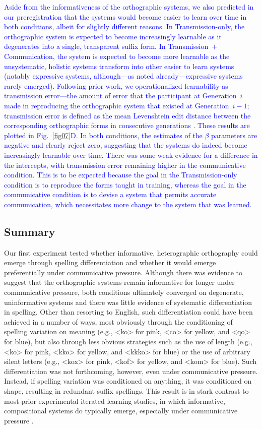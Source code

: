 \documentclass[doc,biblatex]{apa7}
\newcommand\newmaterial[1]{\textcolor{blue}{#1}}
\begin{document}
\newmaterial{Aside from the informativeness of the orthographic systems, we also predicted in our preregistration that the systems would become easier to learn over time in both conditions, albeit for slightly different reasons. In Transmission-only, the orthographic system is expected to become increasingly learnable as it degenerates into a single, transparent suffix form. In Transmission~+ Communication, the system is expected to become more learnable as the unsystematic, holistic systems transform into other easier to learn systems (notably expressive systems, although---as noted already---expressive systems rarely emerged). Following prior work, we operationalized learnability as transmission error---the amount of error that the participant at Generation~$i$ made in reproducing the orthographic system that existed at Generation~$i-1$; transmission error is defined as the mean Levenshtein edit distance between the corresponding orthographic forms in consecutive generations \parencite[see e.g.,][]{Kirby:2008}. These results are plotted in Fig.~\ref{fig07}D. In both conditions, the estimates of the $\beta$ parameters are negative and clearly reject zero, suggesting that the systems do indeed become increasingly learnable over time. There was some weak evidence for a difference in the intercepts, with transmission error remaining higher in the communicative condition. This is to be expected because the goal in the Transmission-only condition is to reproduce the forms taught in training, whereas the goal in the communicative condition is to devise a system that permits accurate communication, which necessitates more change to the system that was learned.}

\subsection{Summary}

Our first experiment tested whether informative, heterographic orthography could emerge through spelling differentiation and whether it would emerge preferentially under communicative pressure. Although there was evidence to suggest that the orthographic systems remain informative for longer under communicative pressure, both conditions ultimately converged on degenerate, uninformative systems and there was little evidence of systematic differentiation in spelling. Other than resorting to English, such differentiation could have been achieved in a number of ways, most obviously through the conditioning of spelling variation on meaning (e.g., <ko> for pink, <co> for yellow, and <qo> for blue), but also through less obvious strategies such as the use of length (e.g., <ko> for pink, <kko> for yellow, and <kkko> for blue) or the use of arbitrary silent letters (e.g., <kox> for pink, <kof> for yellow, and <kom> for blue). Such differentiation was not forthcoming, however, even under communicative pressure. Instead, if spelling variation was conditioned on anything, it was conditioned on shape, resulting in redundant suffix spellings. This result is in stark contrast to most prior experimental iterated learning studies, in which informative, compositional systems do typically emerge, especially under communicative pressure \parencite[e.g.,][]{Kirby:2015}.
\end{document}
